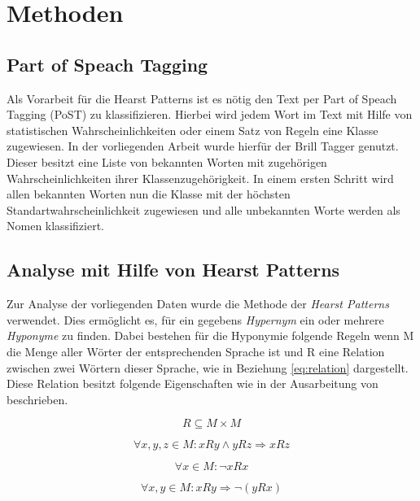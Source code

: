 \section{Methoden}
\subsection{Part of Speach Tagging}
Als Vorarbeit für die Hearst Patterns ist es nötig den Text per Part of Speach Tagging (PoST) zu klassifizieren.
Hierbei wird jedem Wort im Text mit Hilfe von statistischen Wahrscheinlichkeiten oder einem Satz von Regeln eine Klasse zugewiesen.
In der vorliegenden Arbeit wurde hierfür der Brill Tagger genutzt. Dieser besitzt eine Liste von bekannten Worten mit zugehörigen
Wahrscheinlichkeiten ihrer Klassenzugehörigkeit. In einem ersten Schritt wird allen bekannten Worten nun die Klasse mit der höchsten
Standartwahrscheinlichkeit zugewiesen und alle unbekannten Worte werden als Nomen klassifiziert.

\subsection{Analyse mit Hilfe von Hearst Patterns}

Zur Analyse der vorliegenden Daten wurde die Methode der \textit{Hearst Patterns} verwendet. 
Dies ermöglicht es, für ein gegebens \textit{Hypernym} ein oder mehrere \textit{Hyponyme} zu finden. 
Dabei bestehen für die Hyponymie folgende Regeln wenn M die Menge aller Wörter der 
entsprechenden Sprache ist und R eine Relation zwischen zwei Wörtern dieser Sprache, wie in Beziehung \ref{eq:relation} dargestellt.
Diese Relation besitzt folgende Eigenschaften wie in der Ausarbeitung von \cite{bib:Snow2004} beschrieben.

\begin{equation}
  \label{eq:relation}
  R \subseteq M \times M
\end{equation}

\begin{equation}
  \label{eq:trans}
  \forall x, y, z \in M : xRy \land yRz \Rightarrow xRz
\end{equation}

\begin{equation}
  \label{eq:irref}
  \forall x \in M : \neg xRx
\end{equation}

\begin{equation}
  \label{eq:assym}
  \forall x, y \in M : xRy \Rightarrow \neg (yRx)
\end{equation}

